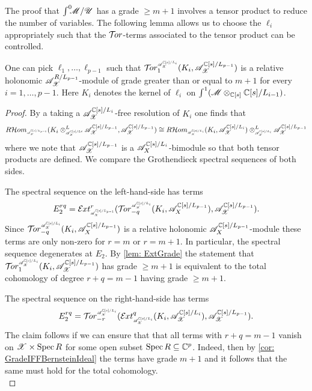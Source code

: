 The proof that $\int^0 \mkern -8mu\mathscr{M}/\mathscr{U}$ has a grade $\geq m+1$ involves a tensor product to reduce the number of variables.
The following lemma allows us to choose the $\ell_i$ appropriately such that the $\mathcal{T}\mkern -3mu or$-terms associated to the tensor product can be controlled.
\begin{lemma}\label{lem: RelHolTorDegree}
  One can pick $\ell_1,\ldots,\ell_{p-1}$ such that $\Tr{\A_\X^{\C[s]/L_{i}} }{1}(K_i, \A_\X^{\C[s]/L_{p-1}})$ is a relative holonomic $\mathscr{A}_{\mathscr{X}}^{R/L_{p-1}}$-module of grade greater than or equal to $m+1$ for every $i=1,\ldots, p-1$.
  Here $K_i$ denotes the kernel of $\ell_i$ on $\int^1 (\mathscr{M} \otimes_{\mathbb{C}[s]}\mathbb{C}[s]/L_{i-1})$.
\end{lemma}
\begin{proof}
  By a taking a $\mathscr{A}_{\mathscr{X}}^{\mathbb{C}[s]/L_{i}}$-free resolution of $K_i$ one finds that
  $$R \Hom_{\scaleto{\A_\X^{ \C[s]/L_{p-1} }}{8pt} }(K_i\otimes^L_{\scaleto{ \A_\X^{\C[s]/L{i}} }{8pt} } \A_\X^{\C[s]/L_{p-1} },\A_\X^{ \C[s]/L_{p-1}} ) \cong R \Hom_{ \scaleto{\A_\X^{\C[s]/L_{i}}}{8pt} } (K_i,\A_\X^{\C[s]/L_{i}}) \otimes^L_{\scaleto{ \A_\X^{\C[s]/L_{i}}}{8pt} } \A_\X^{\C[s]/L_{p-1}}$$
  where we note that $\mathscr{A}_{\mathscr{X}}^{\mathbb{C}[s]/L_{p-1}}$ is a $\mathscr{A}_X^{\mathbb{C}[s]/L_{i}}$-bimodule so that both tensor products are defined.
  We compare the Grothendieck spectral sequences of both sides.

  The spectral sequence on the left-hand-side has terms
  $$E^{rq}_2 = \Ex{\A_\X^{\C[s]/L_{p-1}}}{r}(\Tr{\A_\X^{\C[s]/L_{i}} }{-q}(K_i,\A_X^{\C[s]/L_{p-1}}),\A_\X^{\C[s]/L_{p-1}}).$$
  Since $\Tr{\A_\X^{\C[s]/L_{i}} }{-q}(K_i,\A_X^{\C[s]/L_{p-1}})$ is a relative holonomic $\mathscr{A}_X^{\mathbb{C}[s]/L_{p-1}}$-module these terms are only non-zero for $r=m$ or $r = m+1$.
  In particular, the spectral sequence degenerates at $E_2$.
  By \cref{lem: ExtGrade} the statement that $\Tr{\A_\X^{\C[s]/L_i}}{1}(K_i, \A_\X^{\C[s]/L_{p-1}})$ has grade $\geq m+1$ is equivalent to the total cohomology of degree $r + q = m-1$ having grade $\geq m+1$.

  The spectral sequence on the right-hand-side has terms
  $$E_2^{rq} = \Tr{\A_\X^{\C[s]/L_{i}} }{-r}(\Ex{ \A_\X^{\C[s]/L_{i}} }{q} (K_i,\A_\X^{\C[s]/L_{i}}), \A_\X^{\C[s]/L_{p-1}}).$$
  The claim follows if we can ensure that that all terms with $r+q = m -1$ vanish on $\mathscr{X}\times\operatorname{Spec} R$ for some open subset $\operatorname{Spec} R\subseteq \mathbb{C}^p$.
  Indeed, then by \cref{cor: GradeIFFBernsteinIdeal} the terms have grade $m+1$ and it follows that the same must hold for the total cohomology.
  \\


\end{proof}
